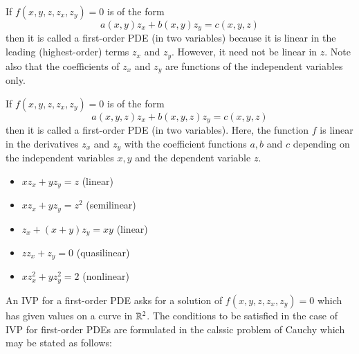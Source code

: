 \documentclass[12pt, a4paper, oneside, openright, titlepage]{book}
\begin{document}
\begin{defn}
    If $f(x,y,z,z_x,z_y) = 0$ is of the form \begin{equation*}
        a(x,y)z_x + b(x,y)z_y = c(x,y,z)
    \end{equation*}
    then it is called a  first-order PDE (in two variables) because it is linear in the leading (highest-order) terms $z_x$ and $z_y$. However, it need not be linear in $z$. Note also that the coefficients of $z_x$ and $z_y$ are functions of the independent variables only.
\end{defn}


\begin{defn}
    If $f(x,y,z,z_x,z_y) = 0$ is of the form \begin{equation*}
        a(x,y,z)z_x + b(x,y,z)z_y = c(x,y,z)
    \end{equation*}
    then it is called a  first-order PDE (in two variables). Here, the function $f$ is linear in the derivatives $z_x$ and $z_y$ with the coefficient functions $a,b$ and $c$ depending on the independent variables $x,y$ and the dependent variable $z$.
\end{defn}


\begin{eg}
    \leavevmode
    \begin{itemize}
        \item $xz_x+yz_y= z$ (linear)
        \item $xz_x + yz_y = z^2$ (semilinear)
        \item $z_x+(x+y)z_y = xy$ (linear)
        \item $zz_x+z_y = 0$ (quasilinear)
        \item $xz_x^2+yz_y^2=2$ (nonlinear)
    \end{itemize}
\end{eg}

An IVP for a first-order PDE asks for a solution of $f(x,y,z,z_x,z_y) = 0$ which has given values on a curve in $\mathbb R^2$. The conditions to be satisfied in the case of IVP for first-order PDEs are formulated in the calssic problem of Cauchy which may be stated as follows:
\end{document}
